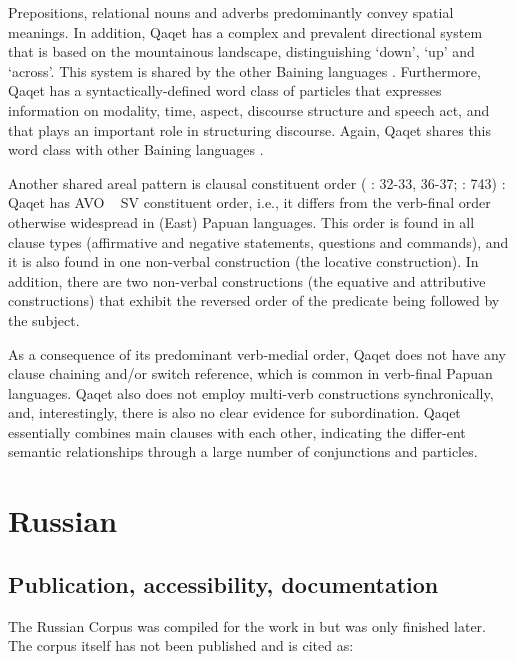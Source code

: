 \documentclass[a4paper, 11pt]{book}
\begin{document}
Prepositions, relational nouns and adverbs predominantly convey spatial meanings. In addition, Qaqet has a complex and prevalent directional system that is based on the mountainous landscape, distinguishing ‘down’, ‘up’ and ‘across’.
This system is shared by the other Baining languages
\citep*[192-206]{stebbins2011mali}.
Furthermore, Qaqet has a syntactically-defined word class of particles that expresses information on modality, time, aspect, discourse structure and speech act, and that plays an important role in structuring discourse. Again, Qaqet shares this word class with other Baining languages
\citep*[93-94, 218-229]{stebbins2011mali}.

Another shared areal pattern is clausal constituent order
(\citeauthor{dunn2002east} \citeyear{dunn2002east}: 32-33, 36-37;
\citeauthor{dunn2008structural} \citeyear{dunn2008structural}: 743)
: Qaqet has AVO ~ SV constituent order, i.e., it differs from the verb-final order otherwise widespread in (East) Papuan languages. This order is found in all clause types (affirmative and negative statements, questions and commands), and it is also found in one non-verbal construction (the locative construction). In addition, there are two non-verbal constructions (the equative and attributive constructions) that exhibit the reversed order of the predicate being followed by the subject.

As a consequence of its predominant verb-medial order, Qaqet does not have any clause chaining and/or switch reference, which is common in verb-final Papuan languages. Qaqet also does not employ multi-verb constructions synchronically, and, interestingly, there is also no clear evidence for subordination. Qaqet essentially combines main clauses with each other, indicating the differ-ent semantic relationships through a large number of conjunctions and particles.

\section{Russian}
\label{sec:Russian}

\subsection{Publication, accessibility, documentation}

The Russian Corpus \citep{Stoll_etal2008a} was compiled for the work in \citet{Stoll2001a} but was only finished later. The corpus itself has not been published and is cited as:
\end{document}
